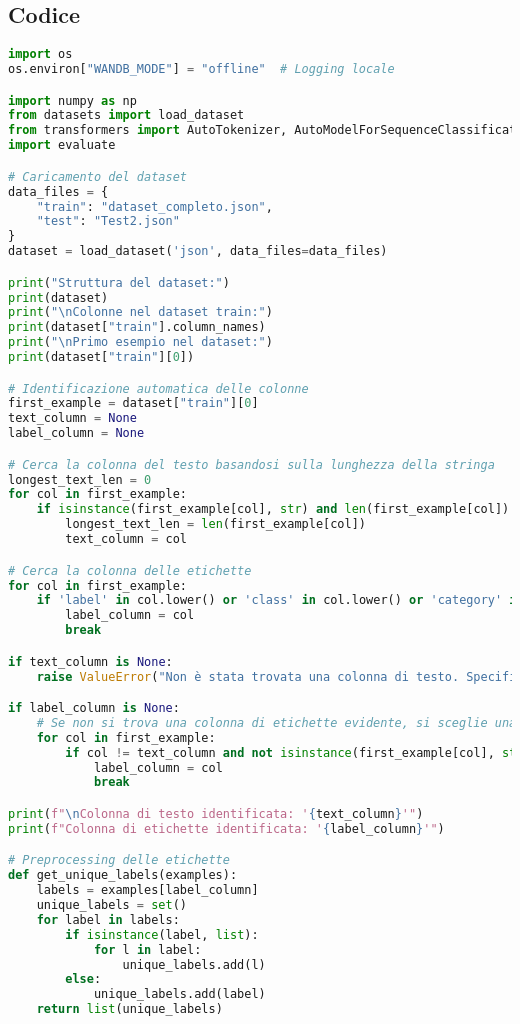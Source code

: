 \documentclass[a4paper,12pt]{article}
\begin{document}
\subsection*{Codice}
\begin{lstlisting}[language=Python, caption={Versione 1}]
import os
os.environ["WANDB_MODE"] = "offline"  # Logging locale

import numpy as np
from datasets import load_dataset
from transformers import AutoTokenizer, AutoModelForSequenceClassification, TrainingArguments, Trainer
import evaluate

# Caricamento del dataset
data_files = {
    "train": "dataset_completo.json",
    "test": "Test2.json"
}
dataset = load_dataset('json', data_files=data_files)

print("Struttura del dataset:")
print(dataset)
print("\nColonne nel dataset train:")
print(dataset["train"].column_names)
print("\nPrimo esempio nel dataset:")
print(dataset["train"][0])

# Identificazione automatica delle colonne
first_example = dataset["train"][0]
text_column = None
label_column = None

# Cerca la colonna del testo basandosi sulla lunghezza della stringa
longest_text_len = 0
for col in first_example:
    if isinstance(first_example[col], str) and len(first_example[col]) > longest_text_len:
        longest_text_len = len(first_example[col])
        text_column = col

# Cerca la colonna delle etichette
for col in first_example:
    if 'label' in col.lower() or 'class' in col.lower() or 'category' in col.lower():
        label_column = col
        break

if text_column is None:
    raise ValueError("Non è stata trovata una colonna di testo. Specifica manualmente il nome della colonna.")

if label_column is None:
    # Se non si trova una colonna di etichette evidente, si sceglie una colonna non testuale
    for col in first_example:
        if col != text_column and not isinstance(first_example[col], str):
            label_column = col
            break

print(f"\nColonna di testo identificata: '{text_column}'")
print(f"Colonna di etichette identificata: '{label_column}'")

# Preprocessing delle etichette
def get_unique_labels(examples):
    labels = examples[label_column]
    unique_labels = set()
    for label in labels:
        if isinstance(label, list):
            for l in label:
                unique_labels.add(l)
        else:
            unique_labels.add(label)
    return list(unique_labels)


\end{lstlisting}
\end{document}
